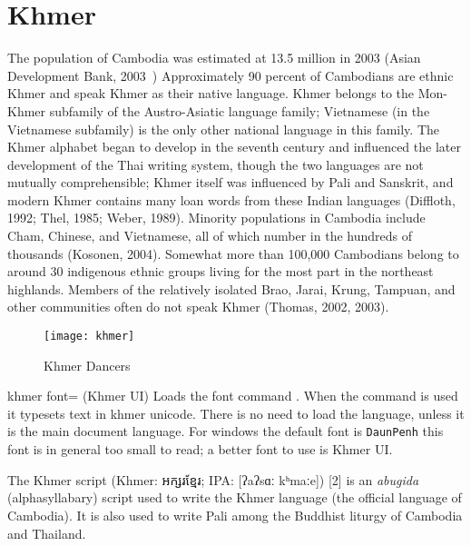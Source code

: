\section{Khmer}
\label{s:khmer}
\newfontfamily{}
\normaltext

\newfontfamily{}
\def\khmertext#1{{\khmer#1}}



The population of Cambodia was estimated at 13.5 million in 2003
(Asian Development Bank, 2003~) Approximately 90 percent of Cambodians
are ethnic Khmer and speak Khmer as their native language. Khmer
belongs to the Mon-Khmer subfamily of the Austro-Asiatic language family;
Vietnamese (in the Vietnamese subfamily) is the only other national language
in this family. The Khmer alphabet began to develop in the seventh
century and influenced the later development of the Thai writing system,
though the two languages are not mutually comprehensible; Khmer itself
was influenced by Pali and Sanskrit, and modern Khmer contains many loan
words from these Indian languages (Diffloth, 1992; Thel, 1985; Weber,
1989). Minority populations in Cambodia include Cham, Chinese, and
Vietnamese, all of which number in the hundreds of thousands (Kosonen,
2004). Somewhat more than 100,000 Cambodians belong to around 30
indigenous ethnic groups living for the most part in the northeast highlands.
Members of the relatively isolated Brao, Jarai, Krung, Tampuan, and other
communities often do not speak Khmer (Thomas, 2002, 2003).

\begin{figure}[htbp]
\texttt{[image: khmer]}
\caption{Khmer Dancers}
\end{figure}


\begin{docKey}[phd]{khmer font}{= (Khmer  UI)} {}
Loads the font
command \cmd{\khmer}. When the command is used it typesets text in
khmer unicode. There is no need to load the language, unless it is the main document language. For windows the default font is \texttt{DaunPenh} this font is in general too small to read; a better font to use is Khmer UI.
\end{docKey}




The Khmer script (Khmer: {\Large\khmertext{អក្សរខ្មែរ}}; IPA: [ʔaʔsɑː kʰmaːe]) [2] is an \textit{abugida} (alphasyllabary) script used to write the Khmer language (the official language of Cambodia). It is also used to write Pali among the Buddhist liturgy of Cambodia and Thailand.

